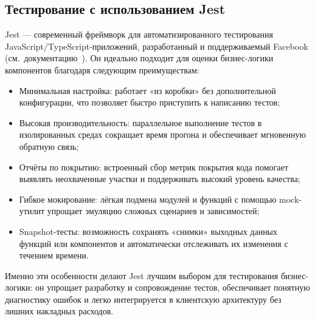 \subsection{Тестирование с использованием Jest}

Jest — современный фреймворк для автоматизированного тестирования JavaScript/TypeScript-приложений, разработанный и поддерживаемый Facebook (см.~документацию~\cite{jest_docs}). Он идеально подходит для оценки бизнес-логики компонентов благодаря следующим преимуществам:
\begin{itemize}
  \item Минимальная настройка: работает «из коробки» без дополнительной конфигурации, что позволяет быстро приступить к написанию тестов;
  \item Высокая производительность: параллельное выполнение тестов в изолированных средах сокращает время прогона и обеспечивает мгновенную обратную связь;
  \item Отчёты по покрытию: встроенный сбор метрик покрытия кода помогает выявлять неохваченные участки и поддерживать высокий уровень качества;
  \item Гибкое мокирование: лёгкая подмена модулей и функций с помощью mock-утилит упрощает эмуляцию сложных сценариев и зависимостей;
  \item Snapshot-тесты: возможность сохранять «снимки» выходных данных функций или компонентов и автоматически отслеживать их изменения с течением времени.
\end{itemize}

Именно эти особенности делают Jest лучшим выбором для тестирования бизнес-логики: он упрощает разработку и сопровождение тестов, обеспечивает понятную диагностику ошибок и легко интегрируется в клиентскую архитектуру без лишних накладных расходов.
